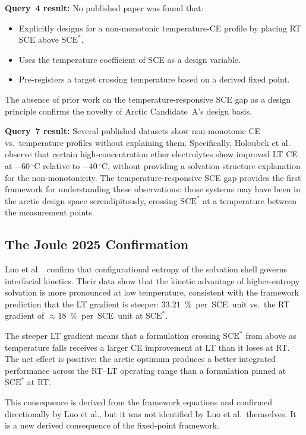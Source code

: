 \documentclass[11pt]{article}
\theoremstyle{plain}
\theoremstyle{definition}
\theoremstyle{remark}
\begin{document}
\textbf{Query~4 result:} No published paper was found that:
\begin{itemize}[leftmargin=2em]
  \item Explicitly designs for a non-monotonic temperature-CE
        profile by placing RT SCE above $\mathrm{SCE}^{*}$.
  \item Uses the temperature coefficient of SCE as a design variable.
  \item Pre-registers a target crossing temperature based on a
        derived fixed point.
\end{itemize}

The absence of prior work on the temperature-responsive SCE gap
as a design principle confirms the novelty of Arctic Candidate~A's
design basis.

\textbf{Query~7 result:} Several published datasets show
non-monotonic CE vs.\ temperature profiles without explaining them.
Specifically, Holoubek et al.\ \cite{Holoubek2021} observe that
certain high-concentration ether electrolytes show improved LT CE
at $-60\,^\circ$C relative to $-40\,^\circ$C, without providing
a solvation structure explanation for the non-monotonicity.
The temperature-responsive SCE gap provides the first framework
for understanding these observations: those systems may have been
in the arctic design space serendipitously, crossing $\mathrm{SCE}^{*}$
at a temperature between the measurement points.

\subsection{The Joule 2025 Confirmation}

Luo et al.\ \cite{Luo2025} confirm that configurational entropy of
the solvation shell governs interfacial kinetics.  Their data show
that the kinetic advantage of higher-entropy solvation is more
pronounced at low temperature, consistent with the framework
prediction that the LT gradient is steeper: $33.21$~\%~per~SCE~unit
vs.\ the RT gradient of $\approx 18$~\%~per~SCE~unit at
$\mathrm{SCE}^{*}$.

The steeper LT gradient means that a formulation crossing
$\mathrm{SCE}^{*}$ from above as temperature falls receives a larger
CE improvement at LT than it loses at RT.  The net effect is positive:
the arctic optimum produces a better integrated performance across
the RT--LT operating range than a formulation pinned at
$\mathrm{SCE}^{*}$ at RT.

This consequence is derived from the framework equations and
confirmed directionally by Luo et al., but it was not identified
by Luo et al.\ themselves.  It is a new derived consequence of the
fixed-point framework.
\end{document}
